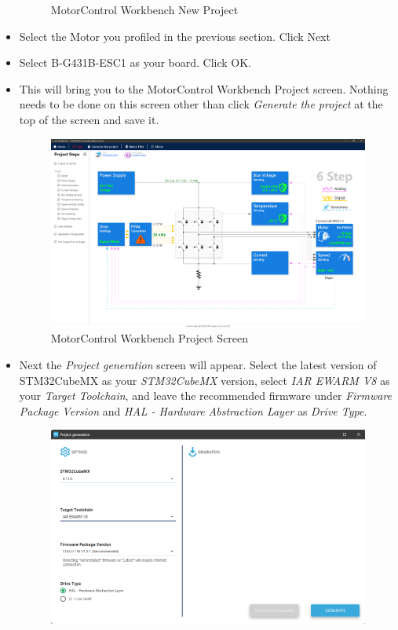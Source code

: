 \documentclass[10pt]{article}
\begin{document}
\begin{itemize}
\begin{figure}[H]
                        \caption{MotorControl Workbench New Project}
                    \end{figure}
                \item Select the Motor you profiled in the previous section. Click Next
                \item Select B-G431B-ESC1 as your board. Click OK.
                \item This will bring you to the MotorControl Workbench Project screen. Nothing needs to be done on this screen other than click \emph{Generate the project} at the top of the screen and save it.
                    \begin{figure}[H]
                        \centerline{\includegraphics[width=\textwidth]{References/MCW Project Screen.png}}
                        \caption{MotorControl Workbench Project Screen}
                    \end{figure}
                \item Next the \emph{Project generation} screen will appear. Select the latest version of STM32CubeMX as your \emph{STM32CubeMX} version, select \emph{IAR EWARM V8} as your \emph{Target Toolchain}, and leave the recommended firmware under \emph{Firmware Package Version} and \emph{HAL - Hardware Abstraction Layer} as \emph{Drive Type}.
                    \begin{figure}[H]
                        \centerline{\includegraphics[width=\textwidth]{References/MCW Project Gen.png}}

\end{figure}
\end{itemize}
\end{document}
